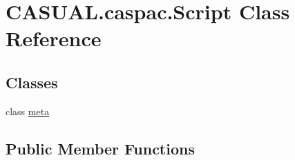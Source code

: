 \hypertarget{class_c_a_s_u_a_l_1_1caspac_1_1_script}{\section{C\-A\-S\-U\-A\-L.\-caspac.\-Script Class Reference}
\label{class_c_a_s_u_a_l_1_1caspac_1_1_script}
}
\subsection*{Classes}
\begin{DoxyCompactItemize}
\item 
class \hyperlink{class_c_a_s_u_a_l_1_1caspac_1_1_script_1_1meta}{meta}
\end{DoxyCompactItemize}
\subsection*{Public Member Functions}
